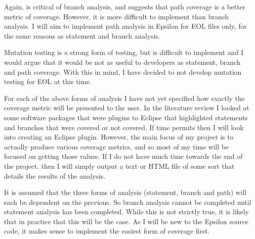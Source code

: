 Again, \citet{Myers:2004:AST:983238} is critical of branch analysis, and suggests that path coverage is a better metric of coverage. However, it is more difficult to implement than branch analysis. I will aim to implement path analysis in Epsilon for EOL files only, for the same reasons as statement and branch analysis.

Mutation testing is a strong form of testing, but is difficult to implement and I would argue that it would be not as useful to developers as statement, branch and path coverage. With this in mind, I have decided to not develop mutation testing for EOL at this time. 


For each of the above forms of analysis I have not yet specified how exactly the coverage metric will be presented to the user. In the literature review I looked at some software packages that were plugins to Eclipse that highlighted statements and branches that were covered or not covered. If time permits then I will look into creating an Eclipse plugin. However, the main focus of my project is to actually produce various coverage metrics, and so most of my time will be focused on getting those values. If I do not have much time towards the end of the project, then I will simply output a text or HTML file of some sort that details the results of the analysis.

It is assumed that the three forms of analysis (statement, branch and path) will each be dependent on the previous. So branch analysis cannot be completed until statement analysis has been completed. While this is not strictly true, it is likely that in practice that this will be the case. As I will be new to the Epsilon source code, it makes sense to implement the easiest form of coverage first.